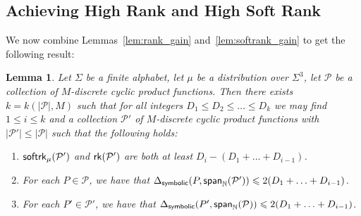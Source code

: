 \documentclass[11pt]{article}
\newtheorem{lemma}[thm]{Lemma}
\newcommand\card[1]{\left| {#1} \right|}
\newcommand\spn{{\sf span}_{\mathbb{N}}}
\renewcommand\leq{\leqslant}
\begin{document}
    \subsection{Achieving High Rank and High Soft Rank}\label{sec:high_bothrank}
    We now combine Lemmas~\ref{lem:rank_gain} and~\ref{lem:softrank_gain} to get the following result:
    \begin{lemma}\label{lem:bothrank_gain}
        Let $\Sigma$ be a finite alphabet, let $\mu$ be a distribution over $\Sigma^3$, let $\mathcal{P}$ be a collection of $M$-discrete cyclic product functions. Then there exists $k = k(\card{\mathcal{P}},M)$
        such that for all integers $D_1\leq D_2\leq\ldots\leq D_k$ we may find $1\leq i\leq k$ and a collection $\mathcal{P}'$ of $M$-discrete cyclic product functions with $|\mathcal{P}'|\leq \card{\mathcal{P}}$ such that the following holds:
        \begin{enumerate}
            \item ${\sf softrk}_{\mu}(\mathcal{P}')$ and ${\sf rk}(\mathcal{P}')$ are both at least $D_i -
        (D_1+\ldots+D_{i-1})$.
            \item For each $P\in\mathcal{P}$, we have that 
            $\Delta_{{\sf symbolic}}(P,\spn(\mathcal{P}'))\leq 2(D_1+\ldots+D_{i-1})$.
            \item For each $P'\in\mathcal{P}'$, we have that 
            $\Delta_{{\sf symbolic}}(P',\spn(\mathcal{P}))\leq 2(D_1+\ldots+D_{i-1})$.
        \end{enumerate}
    \end{lemma}
\end{document}

